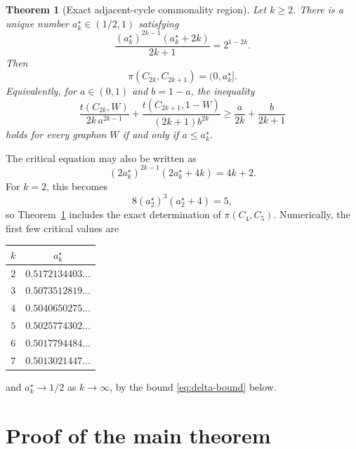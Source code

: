 \documentclass[11pt]{article}
\newtheorem{theorem}{Theorem}[section]
\theoremstyle{definition}
\theoremstyle{remark}
\begin{document}
\begin{theorem}[Exact adjacent-cycle commonality region]
  \label{thm:main}
  Let $k\ge2$.  There is a unique number $a_k^\star\in(1/2,1)$ satisfying
  \begin{equation}
    \frac{(a_k^\star)^{2k-1}(a_k^\star+2k)}{2k+1}
    =2^{1-2k}.
    \label{eq:critical-k}
  \end{equation}
  Then
  \begin{equation}
    \pi(C_{2k},C_{2k+1})=(0,a_k^\star].
    \label{eq:pi-answer}
  \end{equation}
  Equivalently, for $a\in(0,1)$ and $b=1-a$, the inequality
  \begin{equation}
    \frac{t(C_{2k},W)}{2k\,a^{2k-1}}
    +
    \frac{t(C_{2k+1},1-W)}{(2k+1)b^{2k}}
    \ge
    \frac{a}{2k}+\frac{b}{2k+1}
    \label{eq:unscaled-target}
  \end{equation}
  holds for every graphon $W$ if and only if $a\le a_k^\star$.
\end{theorem}

The critical equation may also be written as
\begin{equation}
  (2a_k^\star)^{2k-1}(2a_k^\star+4k)=4k+2.
  \label{eq:critical-equivalent}
\end{equation}
For $k=2$, this becomes
\[
  8(a_2^\star)^3(a_2^\star+4)=5,
\]
so Theorem~\ref{thm:main} includes the exact determination of
$\pi(C_4,C_5)$.  Numerically, the first few critical values are
\begin{center}
\begin{tabular}{cl}
  \toprule
  $k$ & \multicolumn{1}{c}{$a_k^\star$}\\
  \midrule
  $2$ & $0.5172134403...$\\
  $3$ & $0.5073512819...$\\
  $4$ & $0.5040650275...$\\
  $5$ & $0.5025774302...$\\
  $6$ & $0.5017794484...$\\
  $7$ & $0.5013021447...$\\
  \bottomrule
\end{tabular}
\end{center}
and $a_k^\star\to1/2$ as $k\to\infty$, by the bound
\eqref{eq:delta-bound} below.

\section{Proof of the main theorem}
\end{document}
